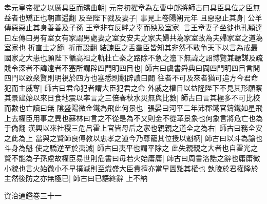 孝元皇帝擢之以厲具臣而矯曲朝|{
	元帝初擢章為左曹中郎將師古曰具臣具位之臣無益者也矯正也朝直遥翻}
及至陛下戮及妻子|{
	事見上卷陽朔元年}
且惡惡止其身|{
	公羊傳惡惡止其身善善及子孫}
王章非有反畔之辜而殃及室家|{
	言王章妻子坐徙也孔穎達曰左傳曰男有室女有家謂男處妻之室女安夫之家夫婦共為家室故為夫婦家室之道為室家也}
折直士之節|{
	折而設翻}
結諫臣之舌羣臣皆知其非然不敢争天下以言為戒最國家之大患也願陛下循高祖之軌杜亡秦之路除不急之灋下無諱之詔博覽兼聽謀及疏賤令深者不諱遠者不塞所謂辟四門明四目也|{
	師古曰虞書舜典曰闢四門明四目言開四門以致衆賢則明視於四方也塞悉則翻辟讀曰闢}
往者不可及來者猶可追方今君命犯而主威奪|{
	師古曰君命犯者謂大臣犯君之命}
外戚之權日以益隆陛下不見其形願察其景建始以來日食地震以率言之三倍春秋水災無與比數|{
	師古曰言其極多不可比校而數也亡讀曰無}
隂盛陽微金鐵為飛此何景也|{
	張晏曰河平二年沛郡鐵官鑄鐵如星飛上去權臣用事之異也蘇林曰言之不從是為不又則金不從革景象也何象言將危亡也為于偽翻}
漢興以來社稷三危呂霍上官皆母后之家也親親之道全之為右|{
	師古曰務全安之此為上}
當與之賢師良傅教以忠孝之道今乃尊寵其位授以魁柄|{
	師古曰以斗為諭也斗身為魁}
使之驕逆至於夷滅|{
	師古曰夷平也謂平除之}
此失親親之大者也自霍光之賢不能為子孫慮故權臣易世則危書曰毋若火始庸庸|{
	師古曰周書洛誥之辭也庸庸微小貌也言火始微小不早撲滅則至熾盛大臣貴擅亦當早圖黜其權也}
埶陵於君權隆於主然後防之亦無極已|{
	師古曰已語終辭}
上不納

資治通鑑卷三十一
